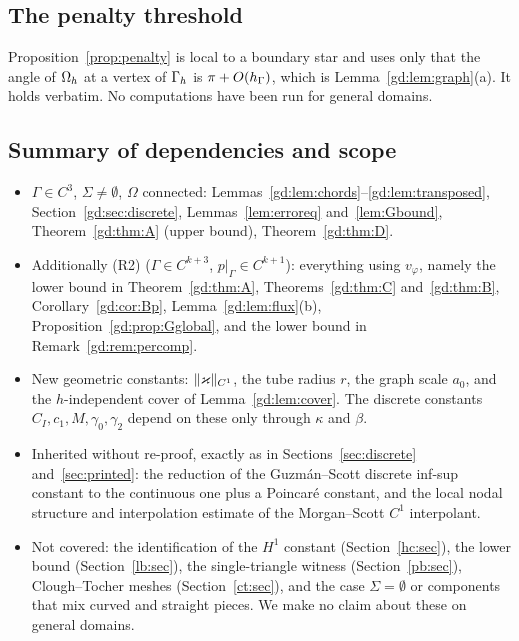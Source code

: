\subsection{The penalty threshold}
Proposition~\ref{prop:penalty} is local to a boundary star and uses only that the angle of $\Omega_h$ at a vertex of $\Gamma_h$ is $\pi+O(h_\Gamma)$, which is Lemma~\ref{gd:lem:graph}(a). It holds verbatim. No computations have been run for general domains.

\subsection{Summary of dependencies and scope}\label{gd:sec:scope}
\begin{itemize}
\item $\Gamma\in C^3$, $\Sigma\ne\emptyset$, $\Omega$ connected: Lemmas~\ref{gd:lem:chords}--\ref{gd:lem:transposed}, Section~\ref{gd:sec:discrete}, Lemmas~\ref{lem:erroreq} and~\ref{lem:Gbound}, Theorem~\ref{gd:thm:A} (upper bound), Theorem~\ref{gd:thm:D}.
\item Additionally (R2) ($\Gamma\in C^{k+3}$, $p|_\Gamma\in C^{k+1}$): everything using $v_\varphi$, namely the lower bound in Theorem~\ref{gd:thm:A}, Theorems~\ref{gd:thm:C} and~\ref{gd:thm:B}, Corollary~\ref{gd:cor:Bp}, Lemma~\ref{gd:lem:flux}(b), Proposition~\ref{gd:prop:Gglobal}, and the lower bound in Remark~\ref{gd:rem:percomp}.
\item New geometric constants: $\lVert \varkappa\rVert_{C^1}$, the tube radius $r$, the graph scale $a_0$, and the $h$-independent cover of Lemma~\ref{gd:lem:cover}. The discrete constants $C_I,c_1,M,\gamma_0,\gamma_2$ depend on these only through $\kappa$ and $\beta$.
\item Inherited without re-proof, exactly as in Sections~\ref{sec:discrete} and~\ref{sec:printed}: the reduction of the Guzm\'an--Scott discrete inf-sup constant to the continuous one plus a Poincar\'e constant, and the local nodal structure and interpolation estimate of the Morgan--Scott $C^1$ interpolant.
\item Not covered: the identification of the $H^1$ constant (Section~\ref{hc:sec}), the lower bound (Section~\ref{lb:sec}), the single-triangle witness (Section~\ref{pb:sec}), Clough--Tocher meshes (Section~\ref{ct:sec}), and the case $\Sigma=\emptyset$ or components that mix curved and straight pieces. We make no claim about these on general domains.
\end{itemize}
